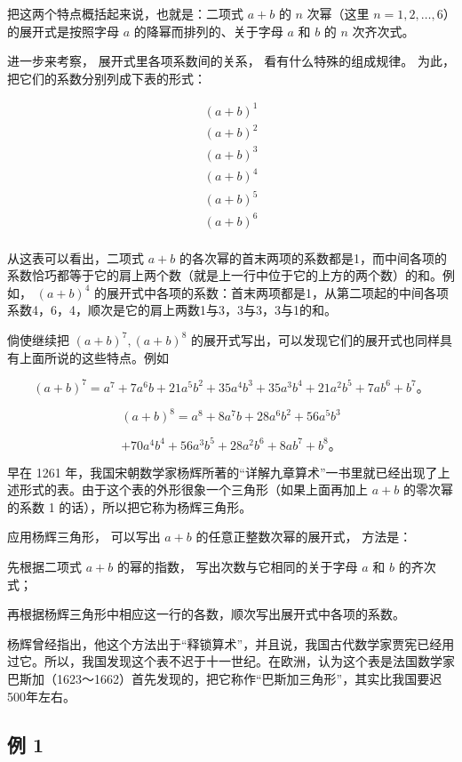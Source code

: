 把这两个特点概括起来说，也就是：二项式 \(a + b\) 的 \(n\) 次幂（这里
\(n = 1,2,\dots ,6\)）的展开式是按照字母 \(a\) 的降幂而排列的、关于字母
\(a\) 和 \(b\) 的 \(n\) 次齐次式。

进一步来考察， 展开式里各项系数间的关系， 看有什么特殊的组成规律。
为此， 把它们的系数分别列成下表的形式：

\[
\begin{array}{l} (a + b) ^ {1} \\ (a + b) ^ {2} \\ (a + b) ^ {3} \\ (a + b) ^ {4} \\ (a + b) ^ {5} \\ (a + b) ^ {6} \\ \end{array}
\]

从这表可以看出，二项式 \(a + b\)
的各次幂的首末两项的系数都是1，而中间各项的系数恰巧都等于它的肩上两个数（就是上一行中位于它的上方的两个数）的和。例如，
\((a + b)^{4}\)
的展开式中各项的系数：首末两项都是1，从第二项起的中间各项系数4，6，4，顺次是它的肩上两数1与3，3与3，3与1的和。

倘使继续把 \((a + b)^7, (a + b)^8\)
的展开式写出，可以发现它们的展开式也同样具有上面所说的这些特点。例如

\[
(a+b)^7=a^7+7a^6b+21a^5b^2+35a^4b^3+35a^3b^4+21a^2b^5+7ab^6+b^7\text{。}
\]

\[
(a+b)^8=a^8+8a^7b+28a^6b^2+56a^5b^3
\]

\[
+70a^4b^4+56a^3b^5+28a^2b^6+8ab^7+b^8\text{。}
\]

早在 1261
年，我国宋朝数学家杨辉所著的``详解九章算术''一书里就已经出现了上述形式的表。由于这个表的外形很象一个三角形（如果上面再加上
\(a + b\) 的零次幂的系数 1 的话），所以把它称为杨辉三角形。

应用杨辉三角形， 可以写出 \(a + b\) 的任意正整数次幂的展开式， 方法是：

先根据二项式 \(a + b\) 的幂的指数， 写出次数与它相同的关于字母 \(a\) 和
\(b\) 的齐次式；

再根据杨辉三角形中相应这一行的各数，顺次写出展开式中各项的系数。


杨辉曾经指出，他这个方法出于``释锁算术''，并且说，我国古代数学家贾宪已经用过它。所以，我国发现这个表不迟于十一世纪。在欧洲，认为这个表是法国数学家巴斯加（1623～1662）首先发现的，把它称作``巴斯加三角形''，其实比我国要迟500年左右。

\subsection{例 1}

